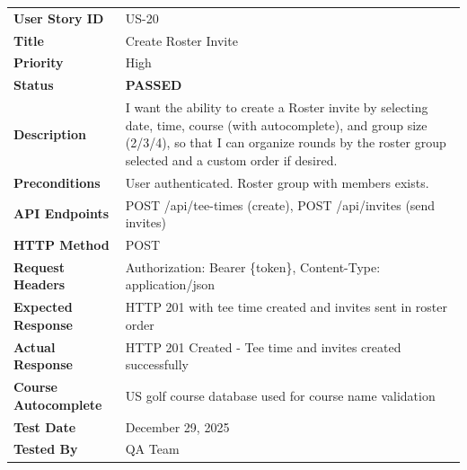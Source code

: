\documentclass[11pt,a4paper]{article}
\newcommand{\passed}{\textcolor{pass}{\textbf{PASSED}}}
\begin{document}
\begin{tabularx}{\textwidth}{|p{3.2cm}|Y|}
\hline
{}
 \\
\hline
\textbf{User Story ID} & US-20 \\
\hline
\textbf{Title} & Create Roster Invite \\
\hline
\textbf{Priority} & High \\
\hline
\textbf{Status} & \passed \\
\hline
\textbf{Description} & I want the ability to create a Roster invite by selecting date, time, course (with autocomplete), and group size (2/3/4), so that I can organize rounds by the roster group selected and a custom order if desired. \\
\hline
\textbf{Preconditions} & User authenticated. Roster group with members exists. \\
\hline
\textbf{API Endpoints} & POST /api/tee-times (create), POST /api/invites (send invites) \\
\hline
\textbf{HTTP Method} & POST \\
\hline
\textbf{Request Headers} & Authorization: Bearer \{token\}, Content-Type: application/json \\
\hline
\textbf{Expected Response} & HTTP 201 with tee time created and invites sent in roster order \\
\hline
\textbf{Actual Response} & HTTP 201 Created - Tee time and invites created successfully \\
\hline
\textbf{Course Autocomplete} & US golf course database used for course name validation \\
\hline
\textbf{Test Date} & December 29, 2025 \\
\hline
\textbf{Tested By} & QA Team \\
\hline
\end{tabularx}
\end{document}
